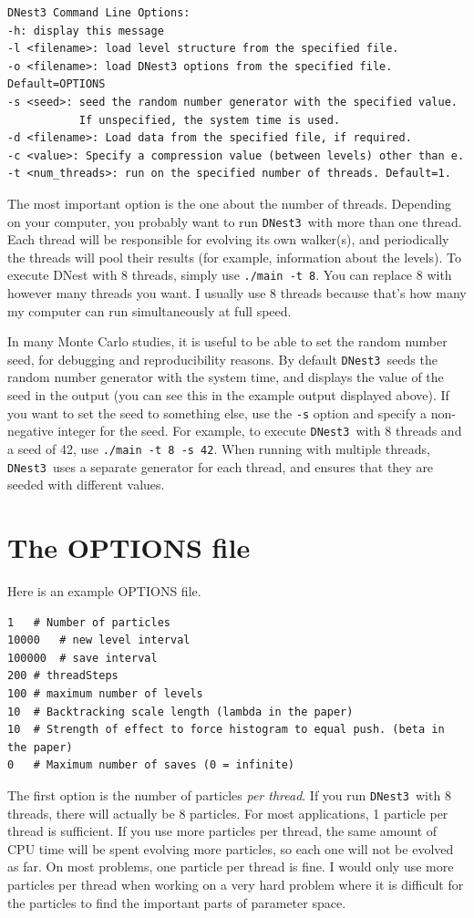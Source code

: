 \documentclass[a4paper, 11pt]{article}
\newcommand{\dnest}{{\tt DNest3}}
\begin{document}
\begin{verbatim}
DNest3 Command Line Options:
-h: display this message
-l <filename>: load level structure from the specified file.
-o <filename>: load DNest3 options from the specified file. Default=OPTIONS
-s <seed>: seed the random number generator with the specified value.
           If unspecified, the system time is used.
-d <filename>: Load data from the specified file, if required.
-c <value>: Specify a compression value (between levels) other than e.
-t <num_threads>: run on the specified number of threads. Default=1.
\end{verbatim}
The most important option is the one about the number of threads. Depending on
your computer, you probably want to run \dnest~with more than one thread.
Each thread will be responsible for evolving its own walker(s), and periodically
the threads will pool their results (for example, information about the
levels). To execute DNest with 8 threads, simply use {\tt ./main -t 8}. You can
replace 8 with however many threads you want. I usually use 8 threads because
that's how many my computer can run simultaneously at full speed.

In many Monte Carlo studies, it is useful to be able to set the random number
seed, for debugging and reproducibility reasons. By default \dnest~seeds the
random number generator with the system time, and displays the value of the
seed in the output (you can see this in the example output displayed above).
If you want to set the seed to
something else, use the {\tt -s} option and specify a non-negative integer for
the seed. For example, to execute \dnest~with
8 threads and a seed of 42, use {\tt ./main -t 8 -s 42}.
When running with multiple threads, \dnest~uses a separate generator for each
thread, and ensures that they are seeded with different values.

\section{The OPTIONS file}
Here is an example OPTIONS file.
\begin{verbatim}
1	# Number of particles
10000	# new level interval
100000	# save interval
200	# threadSteps
100	# maximum number of levels
10	# Backtracking scale length (lambda in the paper)
10	# Strength of effect to force histogram to equal push. (beta in the paper)
0	# Maximum number of saves (0 = infinite)
\end{verbatim}
The first option is the number of particles {\it per thread}. If you run
\dnest~with 8 threads, there will actually be 8 particles. For most
applications, 1 particle per thread is sufficient. If you use more particles
per thread, the same amount of CPU time will be spent evolving more particles,
so each one will not be evolved as far. On most problems, one particle per
thread is fine. I would only use more particles per thread when working on
a very hard problem where it is difficult for the particles to find the
important parts of parameter space.
\end{document}
